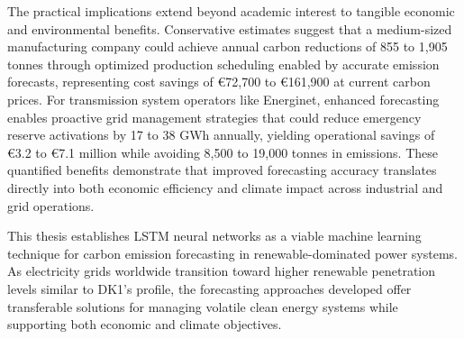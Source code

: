 The practical implications extend beyond academic interest to tangible economic and environmental benefits. Conservative estimates suggest that a medium-sized manufacturing company could achieve annual carbon reductions of 855 to 1,905 tonnes \cotwoe{} through optimized production scheduling enabled by accurate emission forecasts, representing cost savings of \euro72,700 to \euro161,900 at current carbon prices. For transmission system operators like Energinet, enhanced forecasting enables proactive grid management strategies that could reduce emergency reserve activations by 17 to 38 GWh annually, yielding operational savings of \euro3.2 to \euro7.1 million while avoiding 8,500 to 19,000 tonnes \cotwoe{} in emissions. These quantified benefits demonstrate that improved forecasting accuracy translates directly into both economic efficiency and climate impact across industrial and grid operations.

This thesis establishes LSTM neural networks as a viable machine learning technique for carbon emission forecasting in renewable-dominated power systems. As electricity grids worldwide transition toward higher renewable penetration levels similar to DK1's profile, the forecasting approaches developed offer transferable solutions for managing volatile clean energy systems while supporting both economic and climate objectives.
